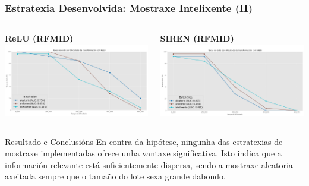 \documentclass[xcolor=dvipsnames]{beamer}
\begin{document}
\begin{frame}
    \frametitle{Estratexia Desenvolvida: Mostraxe Intelixente (II)}

    \begin{columns}[T]
        \begin{column}{0.5\textwidth}
            \centering
            \textbf{ReLU (RFMID)}
            \includegraphics[width=\textwidth]{../imaxes/muestraje/experiment_plot_RFMID_st_relu.png}
        \end{column}
        \begin{column}{0.5\textwidth}
            \centering
            \textbf{SIREN (RFMID)}
            \includegraphics[width=\textwidth]{../imaxes/muestraje/experiment_plot_RFMID_st_SIREN.png}
        \end{column}
    \end{columns}

    \begin{alertblock}{Resultado e Conclusións}
        En contra da hipótese, ningunha das estratexias de mostraxe implementadas ofrece unha vantaxe significativa. Isto indica que a información relevante está suficientemente dispersa, sendo a mostraxe aleatoria axeitada sempre que o tamaño do lote sexa grande dabondo.
    \end{alertblock}

\end{frame}
\end{document}
